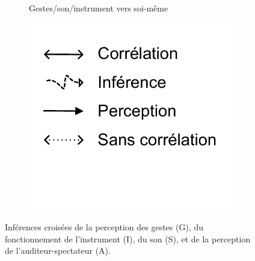 \begin{figure}[!htbp]
{\begin{subfigure}[b]{.33\textwidth}
			\caption{Gestes/son/instrument vers soi-même}
		\end{subfigure}%
		\hspace{.02\linewidth}
		\begin{subfigure}[b]{.33\textwidth}
			\centering
			\includegraphics[width=0.9\linewidth]{gfx/03_gesture/gesture-inference-legendeR.pdf}
		\end{subfigure}%
	}
	\caption{Inférences croisées de la perception des gestes (G), du fonctionnement de l'instrument (I), du son (S), et de la perception de l'auditeur-spectateur (A).}
	\label{fig:gesture:Inferences}
\end{figure}

